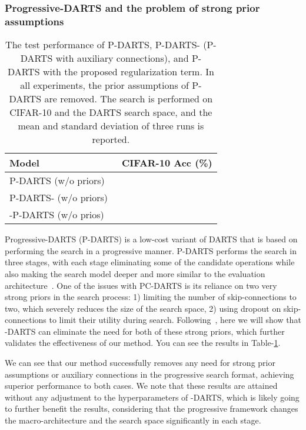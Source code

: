 \documentclass{article} \usepackage{fancyhdr, iclr2023_conference, times}
\newcommand{\mydarts}{-DARTS\xspace}
\begin{document}
\subsubsection{Progressive-DARTS and the problem of strong prior assumptions}
\par \begin{table}[t]
\centering
\caption{The test performance of P-DARTS, P-DARTS- (P-DARTS with auxiliary connections), and P-DARTS with the proposed regularization term. In all experiments, the prior assumptions of P-DARTS are removed. The search is performed on CIFAR-10 and the DARTS search space, and the mean and standard deviation of three runs is reported.} 
\label{table:p-darts}
\begin{tabular}{l|c}
\textbf{Model} &\textbf{CIFAR-10 Acc (\%)} \\ \hline
    P-DARTS (w/o priors)~\citep{DBLP:journals/ijcv/ChenXWT21} & \\
    P-DARTS- (w/o priors)~\citep{DBLP:journals/ijcv/ChenXWT21} & \\\hline
    -P-DARTS (w/o prios) & 
\end{tabular}
\end{table}Progressive-DARTS (P-DARTS) is a low-cost variant of DARTS that is based on performing the search in a progressive manner. P-DARTS performs the search in three stages, with each stage eliminating some of the candidate operations while also making the search model deeper and more similar to the evaluation architecture~\citep{DBLP:journals/ijcv/ChenXWT21}. One of the issues with PC-DARTS is its reliance on two very strong priors in the search process: 1) limiting the number of skip-connections to two, which severely reduces the size of the search space, 2) using dropout on skip-connections to limit their utility during search. Following~\citep{DBLP:conf/iclr/ChuW0LWY21}, here we will show that \mydarts can eliminate the need for both of these strong priors, which further validates the effectiveness of our method. You can see the results in Table-\ref{table:p-darts}.
\par We can see that our method successfully removes any need for strong prior assumptions or auxiliary connections in the progressive search format, achieving superior performance to both cases. We note that these results are attained without any adjustment to the hyperparameters of \mydarts, which is likely going to further benefit the results, considering that the progressive framework changes the macro-architecture and the search space significantly in each stage.
\end{document}
